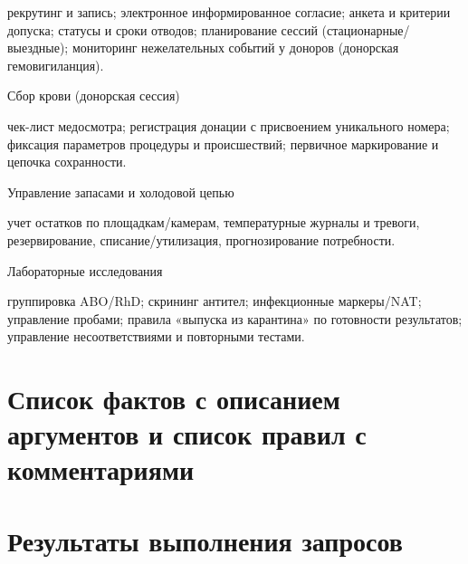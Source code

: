 \documentclass[a4paper,12pt]{article}
\begin{document}
рекрутинг и запись; электронное информированное согласие; анкета и критерии допуска; статусы и сроки отводов; планирование сессий (стационарные/выездные); мониторинг нежелательных событий у доноров (донорская гемовигиланция).

Сбор крови (донорская сессия)

чек-лист медосмотра; регистрация донации с присвоением уникального номера; фиксация параметров процедуры и происшествий; первичное маркирование и цепочка сохранности.

Управление запасами и холодовой цепью

учет остатков по площадкам/камерам, температурные журналы и тревоги, резервирование, списание/утилизация, прогнозирование потребности.

Лабораторные исследования

группировка ABO/RhD; скрининг антител; инфекционные маркеры/NAT; управление пробами; правила «выпуска из карантина» по готовности результатов; управление несоответствиями и повторными тестами.


\section*{Список фактов с описанием аргументов и список правил с комментариями}


\section*{Результаты выполнения запросов}

\end{document}

